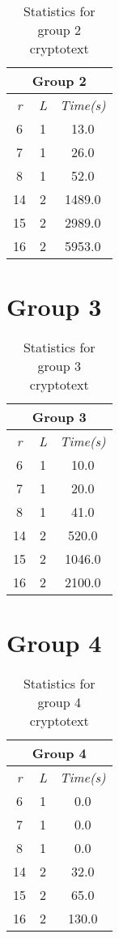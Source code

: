 \documentclass[[UTF8, a4paper, 11pt]{article}
\begin{document}
\begin{table}
  \centering
  \begin{tabular}{ |c|c|c| }
    \hline
    \multicolumn{3}{|c|}{Group 2} \\
    \hline
    \emph{r} & \emph{L} & \emph{Time(s)} \\
    \hline
    6 & 1 & 13.0 \\
    7 & 1 & 26.0 \\
    8 & 1 & 52.0 \\
    14 & 2 & 1489.0 \\
    15 & 2 & 2989.0 \\
    16 & 2 & 5953.0 \\
    \hline
  \end{tabular}
  \caption{Statistics for group 2 cryptotext}
\end{table}

\section{Group 3}

\begin{table}
  \centering
  \begin{tabular}{ |c|c|c| }
    \hline
    \multicolumn{3}{|c|}{Group 3} \\
    \hline
    \emph{r} & \emph{L} & \emph{Time(s)} \\
    \hline
    6 & 1 & 10.0 \\
    7 & 1 & 20.0 \\
    8 & 1 & 41.0 \\
    14 & 2 & 520.0 \\
    15 & 2 & 1046.0 \\
    16 & 2 & 2100.0 \\
    \hline
  \end{tabular}
  \caption{Statistics for group 3 cryptotext}
\end{table}

\section{Group 4}

\begin{table}
  \centering
  \begin{tabular}{ |c|c|c| }
    \hline
    \multicolumn{3}{|c|}{Group 4} \\
    \hline
    \emph{r} & \emph{L} & \emph{Time(s)} \\
    \hline
    6 & 1 & 0.0 \\
    7 & 1 & 0.0 \\
    8 & 1 & 0.0 \\
    14 & 2 & 32.0 \\
    15 & 2 & 65.0 \\
    16 & 2 & 130.0 \\
    \hline
  \end{tabular}
  \caption{Statistics for group 4 cryptotext}
\end{table}
\end{document}
